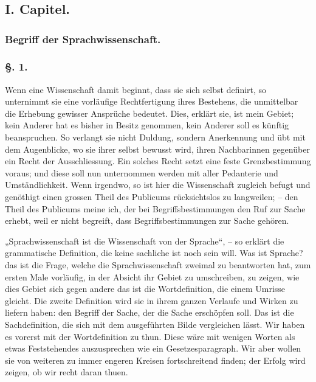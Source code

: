 \chapter*{}
\section*{}
\section*{I. Capitel.}
\subsection*{Begriff der Sprachwissenschaft.}
\subsection*{§. 1.}\label{I.I.1}
\label{fp.1} \label{sp.1}
Wenn eine Wissenschaft damit beginnt, dass sie sich selbst definirt, so unternimmt sie eine vorläufige Rechtfertigung ihres Bestehens, die unmittelbar die Erhebung gewisser Ansprüche bedeutet. Dies, erklärt sie, ist mein Gebiet; kein Anderer hat es bisher in Besitz genommen, kein Anderer soll es künftig beanspruchen. So verlangt sie nicht Duldung, sondern Anerkennung und übt mit dem Augenblicke, wo sie ihrer selbst bewusst wird, ihren Nachbarinnen gegenüber ein Recht der Ausschliessung. Ein solches Recht setzt eine feste Grenzbestimmung voraus; und diese soll nun unternommen werden mit aller Pedanterie und Umständlichkeit. Wenn irgendwo, so ist hier die Wissenschaft zugleich befugt und genöthigt einen grossen Theil des Publicums rücksichtslos zu langweilen; – den Theil des Publicums meine ich, der bei Begriffsbestimmungen den Ruf zur Sache erhebt, weil er nicht begreift, dass Begriffsbestimmungen zur Sache gehören.

„Sprachwissenschaft ist die Wissenschaft von der Sprache“, – so erklärt die grammatische Definition, die keine sachliche ist noch sein will. Was ist Sprache? das ist die Frage, welche die Sprachwissenschaft zweimal zu beantworten hat, zum ersten Male vorläufig, in der Absicht ihr Gebiet zu umschreiben, zu zeigen, wie dies Gebiet sich gegen andere  das ist die Wortdefinition, die einem Umrisse gleicht. Die zweite Definition wird sie in ihrem ganzen Verlaufe und Wirken zu liefern haben: den Begriff der Sache, der die Sache erschöpfen soll. Das ist die Sachdefinition, die sich mit dem ausgeführten Bilde vergleichen lässt. Wir haben es vorerst mit der Wortdefinition zu thun. Diese wäre mit wenigen Worten als etwas Feststehendes auszusprechen wie ein Gesetzesparagraph. Wir aber wollen sie von weiteren zu immer engeren \label{fp.2} Kreisen fortschreitend finden; der Erfolg wird zeigen, ob wir recht daran thuen.

